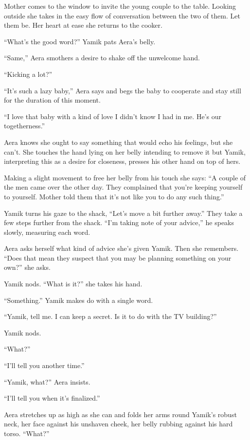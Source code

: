 \documentclass[twoside,11pt]{book}
\begin{document}
Mother comes to the window to invite the young couple to the table. Looking outside she{ }takes in the
easy flow of conversation between the two of them. Let them be. Her heart at ease she returns to the cooker.

``What's the good word?'' Yamik pats Aera's belly.

``Same,'' Aera smothers a desire to shake off the unwelcome hand.

``Kicking a lot?''

``It's such a lazy baby,'' Aera says and begs the baby to cooperate and stay still for the
duration of this moment.

``I love that baby with a kind of love I didn't know I had in me. He's our togetherness.''

Aera knows she ought to say something that would echo his feelings, but she can't. She touches the hand lying on her
belly intending to remove it but Yamik, interpreting this as a desire for closeness, presses his other hand on top of
hers.

Making a slight movement to free her belly from his touch she says:  ``A couple of the men came over the
other day. They complained that you're keeping yourself to yourself. Mother told them that it's not like you to do any
such thing.''

Yamik turns his gaze to the shack, ``Let's move a bit further away.'' They take a few steps
further from the shack. ``I'm taking note of your advice,'' he speaks slowly, measuring each
word.

Aera asks herself what kind of advice she's given Yamik. Then she remembers. ``Does that mean they
suspect that you may be planning something on your own?'' she asks.

Yamik nods.  ``What is it?'' she takes his hand.

``Something.'' Yamik makes do with a single word.

``Yamik, tell me. I can keep a secret. Is it to do with the TV building?''

Yamik nods.

``What?''

``I'll tell you another time.''

``Yamik, what?'' Aera insists.

``I'll tell you when it's finalized.''

Aera stretches up as high as she can and folds her arms round Yamik's robust neck, her face against his unshaven cheek,
her belly rubbing against his hard torso. ``What?''
\end{document}
